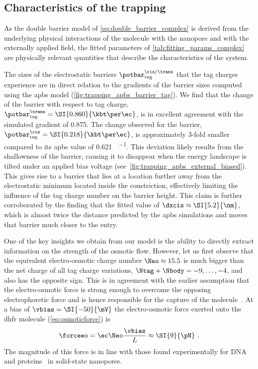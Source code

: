 \subsection{Characteristics of the trapping}
%

As the double barrier model of \cref{eq:double_barrier_complex} is derived from the underlying physical
interactions of the molecule with the nanopore and with the externally applied field, the fitted parameters of
\cref{tab:fitting_params_complex} are physically relevant quantities that describe the characteristics of the
system.

The sizes of the electrostatic barriers $\potbar_{\rm{tag}}^{\cis/\trans}$ that the tag charges experience are
in direct relation to the gradients of the barrier sizes computed using the \gls{apbs} model
(\cref{fig:trapping_apbs_barrier_tag}). We find that the change of the \transi{} barrier with respect to tag
charge, $\potbar_{\rm{tag}}^{\trans} = \text{\SI{0.860}{\kbt\per\ec}}$, is in excellent agreement with the
simulated gradient of \SI{0.875}{\Vt}. The change observed for the \cisi{} barrier, $\potbar_{\rm tag}^{\cis}
= \text{\SI{0.218}{\kbt\per\ec}}$, is approximately 3-fold smaller compared to its \gls{apbs} value of
\SI{0.621}{\kbt\per\ec}. This deviation likely results from the shallowness of the \cisi{} barrier, causing it
to disappear when the energy landscape is tilted under an applied bias voltage
(see~\cref{fig:trapping_apbs_external_biased}). This gives rise to a \cisi{} barrier that lies at a location
further away from the electrostatic minimum located inside the \transi{} constriction, effectively limiting
the influence of the tag charge number on the barrier height. This claim is further corroborated by the
finding that the fitted value of $\dxcis \approx \SI{5.2}{\nm}$, which is almost twice the distance predicted
by the \gls{apbs} simulations and moves that \cisi{} barrier much closer to the \cisi{} entry.

One of the key insights we obtain from our model is the ability to directly extract information on the
strength of the osmotic flow. However, let us first observe that the equivalent electro-osmotic charge number
$\Neo\approx15.5$ is much bigger than the net charge of all tag charge variations, $\Ntag + \Nbody = -
9,\ldots, -4$, and also has the opposite sign. This is in agreement with the earlier assumption that the
electro-osmotic force is strong enough to overcome the opposing electrophoretic force and is hence responsible
for the capture of the molecule~\cite{Soskine-2012,Soskine-Biesemans-2015}. At a bias of $\vbias =
\SI{-50}{\mV}$ the electro-osmotic force exerted onto the \gls{dhfr} molecule (\cref{eq:osmoticforce}) is
%
\begin{equation}
  \forceeo = \ec \Neo \frac{\vbias}{L} \approx \SI{9}{\pN}
  \text{ .}
\end{equation}
%
The magnitude of this force is in line with those found experimentally for
DNA~\cite{Keyser-2006,vanDorp-2009,Lu-2012} and proteins~\cite{Oukhaled-2011} in solid-state nanopores.

